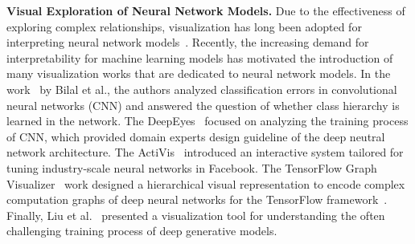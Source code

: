 \textbf{Visual Exploration of Neural Network Models.}
Due to the effectiveness of exploring complex relationships, visualization has long been adopted for interpreting neural network models~\cite{TzengMa2005}.
Recently, the increasing demand for interpretability for machine learning models has motivated the introduction of many visualization works that are dedicated to neural network models.
%
In the work~\cite{BilalJourablooYe2018} by Bilal et al., the authors analyzed classification errors in convolutional neural networks (CNN) and answered the question of whether class hierarchy is learned in the network.
%
The DeepEyes~\cite{Pezzotti2018} focused on analyzing the training process of CNN, which provided domain experts design guideline of the deep neutral network architecture.
%
The ActiVis~\cite{KahngAndrewsKalro2018} introduced an interactive system tailored for tuning industry-scale neural networks in Facebook.
The TensorFlow Graph Visualizer~\cite{Wongsuphasawat2018} work designed a hierarchical visual representation to encode complex computation graphs of deep neural networks for the TensorFlow framework~\cite{Abadi2016}.
Finally, Liu et al.~\cite{LiuShiCao2018} presented a visualization tool for understanding the often challenging training process of deep generative models.


